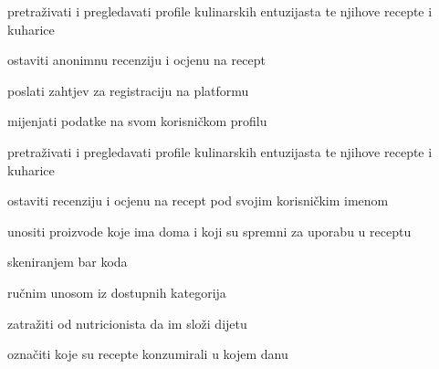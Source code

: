 			\begin{packed_enum}
				\item  {}
				
				\begin{packed_enum}
					
					\item pretraživati i pregledavati profile kulinarskih entuzijasta te njihove recepte i kuharice
					\item ostaviti anonimnu recenziju i ocjenu na recept
					\item poslati zahtjev za registraciju na platformu
					
				\end{packed_enum}
			
				\item  {}
		
				\begin{packed_enum}
					
					\item mijenjati podatke na svom korisničkom profilu
					\item pretraživati i pregledavati profile kulinarskih entuzijasta te njihove recepte i kuharice
					\item ostaviti recenziju i ocjenu na recept pod svojim korisničkim imenom
					\item unositi proizvode koje ima doma i koji su spremni za uporabu u receptu
						\begin{packed_enum}
							\item skeniranjem bar koda
							\item ručnim unosom iz dostupnih kategorija
						\end{packed_enum}
					\item zatražiti od nutricionista da im složi dijetu
					\item označiti koje su recepte konzumirali u kojem danu
					
				\end{packed_enum}
				

\end{packed_enum}
